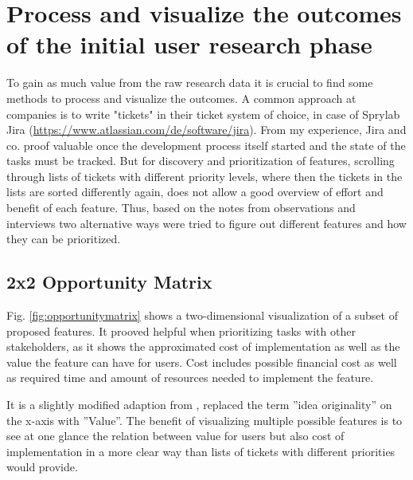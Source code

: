 \section{Process and visualize the outcomes of the initial user research phase}

To gain as much value from the raw research data it is crucial to find some methods to process and visualize the outcomes.
A common approach at companies is to write "tickets" in their ticket system of choice, in case of Sprylab Jira (\url{https://www.atlassian.com/de/software/jira}).
From my experience, Jira and co. proof valuable once the development process itself started and the state of the tasks must be tracked.
But for discovery and prioritization of features, scrolling through lists of tickets with different priority levels, where then the tickets in the lists are sorted differently again, does not allow a good overview of effort and benefit of each feature.
Thus, based on the notes from observations and interviews two alternative ways were tried to figure out different features and how they can be prioritized.

\subsection{2x2 Opportunity Matrix}

Fig. \ref{fig:opportunitymatrix} shows a two-dimensional visualization of a subset of proposed features.
It prooved helpful when prioritizing tasks with other stakeholders,
as it shows the approximated cost of implementation as well as the value the feature can have for users.
Cost includes possible financial cost as well as required time and amount of resources needed to implement the feature.

It is a slightly modified adaption from \cite[p. 181]{LearnHCI:2020ys}, replaced the term ''idea originality'' on the x-axis with ''Value''.
The benefit of visualizing multiple possible features is to see at one glance the relation between value for users but also cost of implementation in a more clear way than lists of tickets with different priorities would provide.

